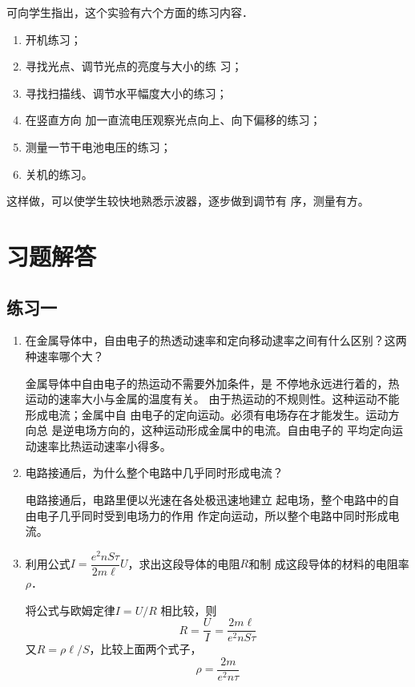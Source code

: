 可向学生指出，这个实验有六个方面的练习内容．
\begin{enumerate}
    \item 开机练习； \item 寻找光点、调节光点的亮度与大小的练
    习； \item 寻找扫描线、调节水平幅度大小的练习； \item 在竖直方向
    加一直流电压观察光点向上、向下偏移的练习； \item 测量一节干电池电压的练习；\item 关机的练习。
\end{enumerate}


这样做，可以使学生较快地熟悉示波器，逐步做到调节有
序，测量有方。

\section{习题解答}

\subsection{练习一}
\begin{enumerate}
    \item 在金属导体中，自由电子的热透动速率和定向移动逮率之间有什么区别？这两种速率哪个大？

    \begin{solution}
        金属导体中自由电子的热运动不需要外加条件，是
        不停地永远进行着的，热运动的速率大小与金属的温度有关。
        由于热运动的不规则性。这种运动不能形成电流；金属中自
        由电子的定向运动。必须有电场存在才能发生。运动方向总
        是逆电场方向的，这种运动形成金属中的电流。自由电子的
        平均定向运动速率比热运动速率小得多。
    \end{solution}
    
    \item 电路接通后，为什么整个电路中几乎同时形成电流？

    \begin{solution}
        电路接通后，电路里便以光速在各处极迅速地建立
        起电场，整个电路中的自由电子几乎同时受到电场力的作用
        作定向运动，所以整个电路中同时形成电流。
    \end{solution}
    
    \item 利用公式$I=\dfrac{e^2 nS\tau}{2m\ell}U$，求出这段导体的电阻$R$和制
成这段导体的材料的电阻率$\rho$．

\begin{solution}
    将公式与欧姆定律$I=U/R$
    相比较，则
    \[R=\frac{U}{I}=\frac{2m\ell}{e^2 nS\tau}\]
又$R=\rho\ell/S$，比较上面两个式子，
\[\rho=\frac{2m}{e^2 n\tau}\]
\end{solution}

\end{enumerate}

